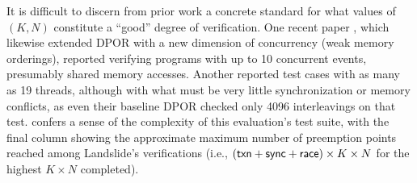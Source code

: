 It is difficult to discern from prior work a concrete standard
for what values of $(K, N)$ constitute a ``good'' degree of verification.
One recent paper \cite{tsopso},
which likewise extended DPOR with a new dimension of concurrency (weak memory orderings),
reported verifying programs with up to 10 concurrent events,
presumably shared memory accesses.
Another \cite{optimal-dpor}
reported test cases with as many as 19 threads,
although with what must be very little synchronization or memory conflicts,
as even their baseline DPOR checked only 4096 interleavings on that test.
%
 confers a sense of the complexity of this evaluation's test suite,
with the final column showing the approximate maximum number of preemption points
reached among Landslide's verifications
(i.e., $({\sf txn}+{\sf sync}+{\sf race}) \times K \times N$ for the highest $K \times N$ completed).

